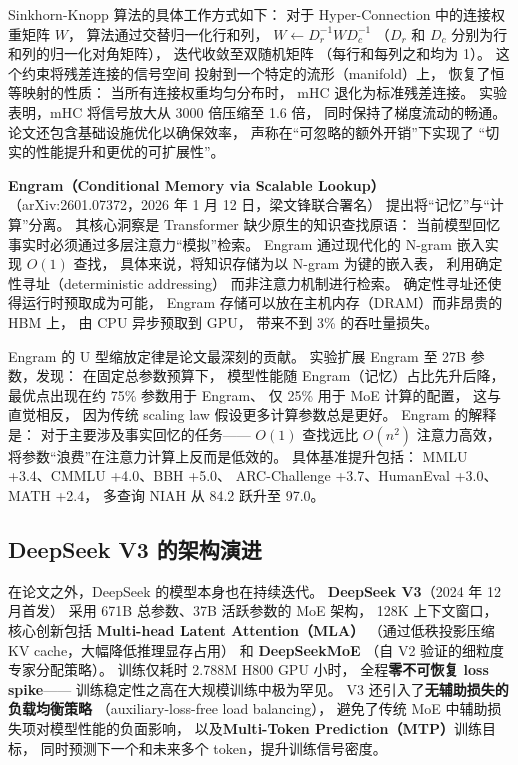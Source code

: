 Sinkhorn-Knopp 算法的具体工作方式如下：
对于 Hyper-Connection 中的连接权重矩阵 $W$，
算法通过交替归一化行和列，
$W \leftarrow D_r^{-1} W D_c^{-1}$
（$D_r$ 和 $D_c$ 分别为行和列的归一化对角矩阵），
迭代收敛至双随机矩阵
（每行和每列之和均为 1）。
这个约束将残差连接的信号空间
投射到一个特定的流形（manifold）上，
恢复了恒等映射的性质：
当所有连接权重均匀分布时，
mHC 退化为标准残差连接。
实验表明，mHC 将信号放大从 3000 倍压缩至 1.6 倍，
同时保持了梯度流动的畅通。
论文还包含基础设施优化以确保效率，
声称在“可忽略的额外开销”下实现了
“切实的性能提升和更优的可扩展性”。

\textbf{Engram（Conditional Memory via Scalable Lookup）}%
（arXiv:2601.07372，2026 年 1 月 12 日，梁文锋联合署名）
提出将“记忆”与“计算”分离。
其核心洞察是 Transformer 缺少原生的知识查找原语：
当前模型回忆事实时必须通过多层注意力“模拟”检索。
Engram 通过现代化的 N-gram 嵌入实现 $O(1)$ 查找，
具体来说，将知识存储为以 N-gram 为键的嵌入表，
利用确定性寻址（deterministic addressing）
而非注意力机制进行检索。
确定性寻址还使得运行时预取成为可能，
Engram 存储可以放在主机内存（DRAM）而非昂贵的 HBM 上，
由 CPU 异步预取到 GPU，
带来不到 3\% 的吞吐量损失。

Engram 的 U 型缩放定律是论文最深刻的贡献。
实验扩展 Engram 至 27B 参数，发现：
在固定总参数预算下，
模型性能随 Engram（记忆）占比先升后降，
最优点出现在约 75\% 参数用于 Engram、
仅 25\% 用于 MoE 计算的配置，
这与直觉相反，
因为传统 scaling law 假设更多计算参数总是更好。
Engram 的解释是：
对于主要涉及事实回忆的任务——
$O(1)$ 查找远比 $O(n^2)$ 注意力高效，
将参数“浪费”在注意力计算上反而是低效的。
具体基准提升包括：
MMLU +3.4、CMMLU +4.0、BBH +5.0、
ARC-Challenge +3.7、HumanEval +3.0、MATH +2.4，
多查询 NIAH 从 84.2 跃升至 97.0。

\subsection{DeepSeek V3 的架构演进}

在论文之外，DeepSeek 的模型本身也在持续迭代。
\textbf{DeepSeek V3}（2024 年 12 月首发）
采用 671B 总参数、37B 活跃参数的 MoE 架构，
128K 上下文窗口，
核心创新包括 \textbf{Multi-head Latent Attention（MLA）}
（通过低秩投影压缩 KV cache，大幅降低推理显存占用）
和 \textbf{DeepSeekMoE}
（自 V2 验证的细粒度专家分配策略）。
训练仅耗时 2.788M H800 GPU 小时，
全程\textbf{零不可恢复 loss spike}——
训练稳定性之高在大规模训练中极为罕见。
V3 还引入了\textbf{无辅助损失的负载均衡策略}
（auxiliary-loss-free load balancing），
避免了传统 MoE 中辅助损失项对模型性能的负面影响，
以及\textbf{Multi-Token Prediction（MTP）}训练目标，
同时预测下一个和未来多个 token，提升训练信号密度。

